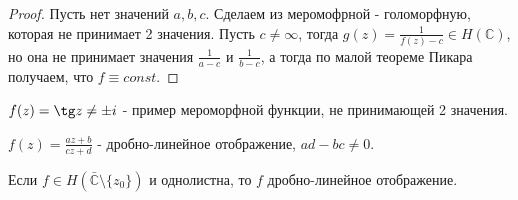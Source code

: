 \begin{proof}
    Пусть нет значений $a, b, c$. Сделаем из меромофрной - голоморфную, которая не принимает 2 значения.
    Пусть $c \neq \infty$, тогда $g(z) = \frac{1}{f(z) - c} \in H(\mathbb{C})$, но она не
    принимает значения $\frac{1}{a - c}$ и $\frac{1}{b - c}$, а тогда по малой теореме Пикара получаем, что $f \equiv const$.
\end{proof}

\begin{example}
    $f(z) = \tg z \neq \pm i$ - пример мероморфной функции, не принимающей 2 значения.
\end{example}

\begin{definition}
    $f(z) = \frac{az + b}{cz + d}$ - дробно-линейное отображение, $ad - bc \neq 0$.
\end{definition}

\begin{theorem}
    Если $f \in H(\bar{\mathbb{C}} \setminus \{z_0\})$ и однолистна, то $f$ дробно-линейное отображение.
\end{theorem}


